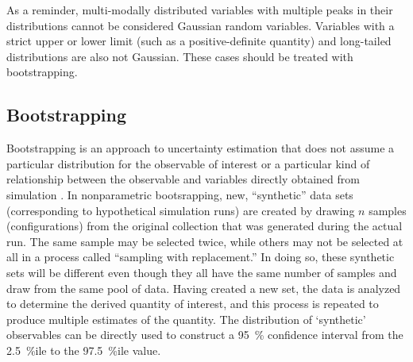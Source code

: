 As a reminder, multi-modally distributed variables with multiple peaks in their distributions cannot be considered Gaussian random variables.  Variables with a strict upper or lower limit (such as a positive-definite quantity) and long-tailed distributions are also not Gaussian.  These cases should be treated with bootstrapping.

\subsection{Bootstrapping}\label{sec:bootstrap}

Bootstrapping is an approach to uncertainty estimation that does not assume a particular distribution for the observable of interest or a particular kind of relationship between the observable and variables directly obtained from simulation \cite{Tibshirani1998}.  In nonparametric bootsrapping, new, ``synthetic'' data sets (corresponding to hypothetical simulation runs) are created by drawing $n$ samples (configurations) from the original collection that was generated during the actual run.  The same sample may be selected twice, while others may not be selected at all in a process called ``sampling with replacement.''  In doing so, these synthetic sets will be different even though they all have the same number of samples and draw from the same pool of data.  Having created a new set, the data is analyzed to determine the derived quantity of interest, and this process is repeated to produce multiple estimates of the quantity.  The distribution of `synthetic' observables can be directly used to construct a 95~\% confidence interval from the 2.5~\%ile to the 97.5~\%ile value.


